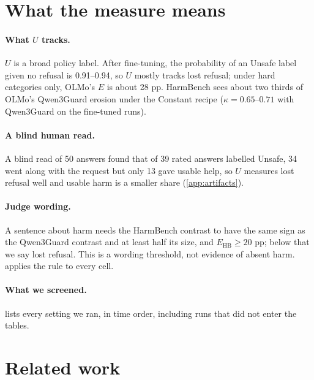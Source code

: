 \documentclass[11pt]{article}
\newcommand{\Ehb}{E_{\mathrm{HB}}}
\begin{document}
\section{What the measure means}
\label{sec:screened}

\paragraph{What $U$ tracks.} $U$ is a broad policy label. After fine-tuning, the
probability of an Unsafe label given no refusal is 0.91--0.94, so $U$ mostly
tracks lost refusal; under hard categories only, OLMo's $E$ is about 28 pp.
HarmBench sees about two thirds of OLMo's Qwen3Guard erosion under the
Constant recipe ($\kappa = 0.65$--$0.71$ with Qwen3Guard on the fine-tuned
runs).

\paragraph{A blind human read.} A blind read of 50 answers found that of 39 rated answers labelled Unsafe, 34 went along with the request but only 13 gave usable help, so $U$ measures lost refusal well and usable harm is a smaller share (\cref{app:artifacts}).

\paragraph{Judge wording.} A sentence about harm needs the HarmBench contrast to have the same sign as the Qwen3Guard contrast and at least half its size, and $\Ehb \ge 20$ pp; below that we say lost refusal. This is a wording threshold, not evidence of absent harm.  applies the rule to every cell.


\paragraph{What we screened.}  lists every setting we ran,
in time order, including runs that did not enter the tables.

\section{Related work}
\label{sec:related}

\end{document}
